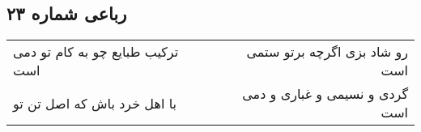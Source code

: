 \begin{center}
\section*{رباعی شماره ۲۳}
\label{sec:sh023}
\begin{longtable}{l p{0.5cm} r}
ترکیب طبایع چو به کام تو دمی است
&&
رو شاد بزی اگرچه برتو ستمی است
\\
با اهل خرد باش که اصل تن تو
&&
گردی و نسیمی و غباری و دمی است
\\
\end{longtable}
\end{center}
